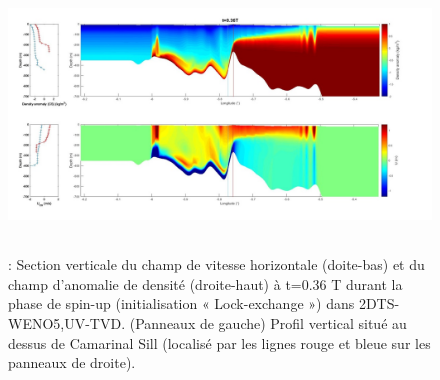 
\begin{figure}[!h]
	\begin{Center}
		\includegraphics[width=5.68in,height=2.84in]{./media/TVD3.jpeg}
		\caption{: Section verticale du champ de vitesse horizontale (doite-bas) et du champ d’anomalie de densité (droite-haut) à t=0.36 T durant la phase de spin-up (initialisation « Lock-exchange ») dans 2DTS-WENO5,UV-TVD. (Panneaux de gauche) Profil vertical situé au dessus de Camarinal Sill (localisé par les lignes rouge et bleue sur les panneaux de droite).}
		\label{Fig_TVD3}
	\end{Center}
\end{figure}

